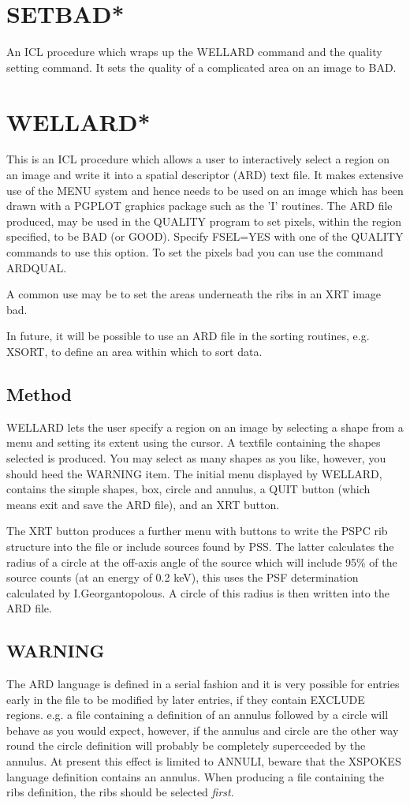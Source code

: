 \documentclass{book}
\renewcommand{\_}{{\tt\char'137}}     %
\begin{document}
\section{SETBAD*}
An ICL procedure which wraps up the WELLARD command and the quality
setting command. It sets the quality of a complicated area on an image
to BAD.
 
\section{WELLARD*}
This is an ICL procedure which allows a user to interactively select a
region on an image and write it into a spatial descriptor (ARD) text file.
It makes extensive use of the MENU system and hence needs to be used
on an image which has been drawn with a PGPLOT graphics package such
as the 'I' routines. The ARD file produced, may be used in the QUALITY
program to set pixels, within the region specified, to be BAD (or GOOD).
Specify FSEL=YES with one of the QUALITY commands to use this option.
To set the pixels bad you can use the command ARDQUAL.
 
A common use may be to set the areas underneath the ribs in an XRT image
bad.
 
In future, it will be possible to use an ARD file in the sorting routines,
e.g. XSORT, to define an area within which to sort data.
\subsection{Method}
WELLARD lets the user specify a region on an image by selecting a shape
from a menu and setting its extent using the cursor. A textfile
containing the shapes selected is produced. You may select as many shapes
as you like, however, you should heed the WARNING item.
The initial menu displayed by WELLARD, contains the simple shapes, box, circle
and annulus, a QUIT button (which means exit and save the ARD file),
and an XRT button.
 
The XRT button produces a further menu with buttons
to write the PSPC rib structure into the file or include sources
found by PSS. The latter calculates the radius of a circle at the
off-axis angle of the source which will include 95\% of the source
counts (at an energy of 0.2 keV), this uses the PSF determination
calculated by I.Georgantopolous. A circle of this radius is then written
into the ARD file.
 
\subsection{WARNING}
The ARD language is defined in a serial fashion and it is very possible
for entries early in the file to be modified by later entries, if they
contain EXCLUDE regions. e.g. a file containing a definition of an
annulus followed by a circle will behave as you would expect, however, if the
annulus and circle are the other way round the circle definition will
probably be completely superceeded by the annulus. At present this
effect is limited to ANNULI, beware that the XSPOKES language definition
contains an annulus. When producing a file containing the ribs definition,
the ribs should be selected {\em first}.
\end{document}
